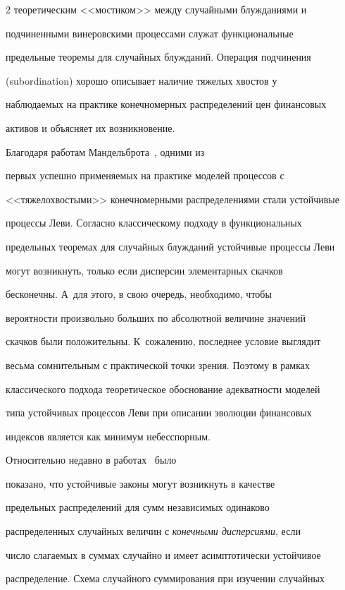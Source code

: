 \begin{multicols}{2}
теоретическим <<мостиком>> между случайными блужданиями и

подчиненными винеровскими процессами служат функциональные

предельные теоремы для случайных блужданий. Операция подчинения

(subordination) хорошо описывает наличие тяжелых хвостов у

наблюдаемых на практике конечномерных распределений цен финансовых

активов и объясняет их возникновение.



Благодаря работам Мандельброта~\cite{Mandelbrot1963}, одними из

первых успешно применяемых на практике моделей процессов с

<<тяжелохвостыми>> конечномерными распределениями стали устойчивые

процессы Леви. Согласно классическому подходу в функциональных

предельных теоремах для случайных блуж\-да\-ний устойчивые процессы Леви

могут возникнуть, только если дисперсии элементарных скачков

бесконечны. А~для этого, в свою очередь, необходимо, чтобы

вероятности произвольно больших по абсолютной величине значений

скачков были положительны. К~сожалению, последнее условие выглядит

весьма сомнительным с практической точки зрения. Поэтому в рамках

классического подхода теоретическое обоснование адекватности моделей

типа устойчивых процессов Леви при описании эволюции финансовых

индексов является как минимум небесспорным.



Относительно недавно в работах~\cite{Korolev1998, Korolev1999} было

показано, что устойчивые законы могут возникнуть в качестве

предельных распределений для сумм независимых одинаково

распределенных случайных величин с {\it конечными дисперсиями}, если

число слагаемых в суммах случайно и имеет асимптотически устойчивое

распределение. Схема случайного суммирования при изучении случайных


\end{multicols}
